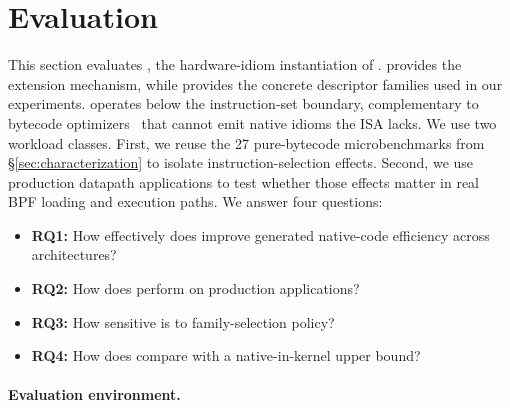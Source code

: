 \section{Evaluation}
\label{sec:eval}

This section evaluates \lang, the hardware-idiom instantiation of \tool.
\tool provides the extension mechanism, while \lang provides the concrete descriptor families used in our experiments.
\lang operates below the instruction-set boundary, complementary to bytecode optimizers~\cite{xu2021synthesizing,mao2024merlin,zhu2025epso} that cannot emit native idioms the ISA lacks.
We use two workload classes.
First, we reuse the 27 pure-bytecode microbenchmarks from \S\ref{sec:characterization} to isolate instruction-selection effects.
Second, we use production datapath applications to test whether those effects matter in real BPF loading and execution paths.
We answer four questions:

\begin{itemize}
\item \textbf{RQ1:} How effectively does \lang improve generated native-code efficiency across architectures?
\item \textbf{RQ2:} How does \lang perform on production applications?
\item \textbf{RQ3:} How sensitive is \lang to family-selection policy?
\item \textbf{RQ4:} How does \tool compare with a native-in-kernel upper bound?
\end{itemize}

\paragraph{Evaluation environment.}


